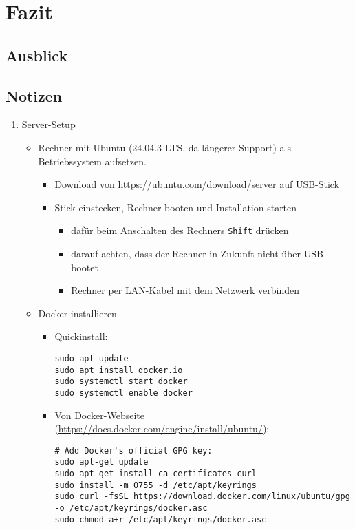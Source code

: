 \documentclass[12pt,a4paper]{report}
\begin{document}
\chapter*{Fazit}
\setcounter{section}{0}

\section{Ausblick}

\section{Notizen}

\begin{enumerate}
  \item Server-Setup
    \begin{itemize}
      \item Rechner mit Ubuntu (24.04.3 LTS, da längerer Support) als Betriebssystem aufsetzen.
        \begin{itemize}
          \item Download von \url{https://ubuntu.com/download/server} auf USB-Stick
          \item Stick einstecken, Rechner booten und Installation starten
            \begin{itemize}
              \item dafür beim Anschalten des Rechners \texttt{Shift} drücken
              \item darauf achten, dass der Rechner in Zukunft nicht über USB bootet
              \item Rechner per LAN-Kabel mit dem Netzwerk verbinden
            \end{itemize}
        \end{itemize}

      \item Docker installieren
        \begin{itemize}
          \item Quickinstall:
          \begin{verbatim}
sudo apt update
sudo apt install docker.io
sudo systemctl start docker
sudo systemctl enable docker
          \end{verbatim}

          \item Von Docker-Webseite (\url{https://docs.docker.com/engine/install/ubuntu/}):
          \begin{verbatim}
# Add Docker's official GPG key:
sudo apt-get update
sudo apt-get install ca-certificates curl
sudo install -m 0755 -d /etc/apt/keyrings
sudo curl -fsSL https://download.docker.com/linux/ubuntu/gpg -o /etc/apt/keyrings/docker.asc
sudo chmod a+r /etc/apt/keyrings/docker.asc


\end{verbatim}
\end{itemize}
\end{itemize}
\end{enumerate}
\end{document}
